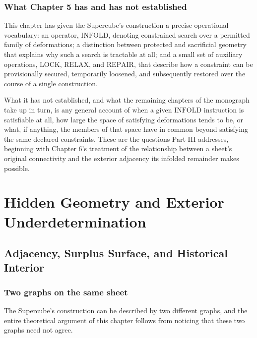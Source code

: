 \documentclass[11pt,oneside]{book}
\begin{document}
\hypertarget{what-chapter-5-has-and-has-not-established}{%
\section{What Chapter 5 has and has not
established}\label{what-chapter-5-has-and-has-not-established}}

This chapter has given the Supercube's construction a precise
operational vocabulary: an operator, \(\text{INFOLD}\), denoting
constrained search over a permitted family of deformations; a
distinction between protected and sacrificial geometry that explains why
such a search is tractable at all; and a small set of auxiliary
operations, \(\text{LOCK}\), \(\text{RELAX}\), and \(\text{REPAIR}\),
that describe how a constraint can be provisionally secured, temporarily
loosened, and subsequently restored over the course of a single
construction.

What it has not established, and what the remaining chapters of the
monograph take up in turn, is any general account of when a given
\(\text{INFOLD}\) instruction is satisfiable at all, how large the space
of satisfying deformations tends to be, or what, if anything, the
members of that space have in common beyond satisfying the same declared
constraints. These are the questions Part III addresses, beginning with
Chapter 6's treatment of the relationship between a sheet's original
connectivity and the exterior adjacency its infolded remainder makes
possible.

\part{Hidden Geometry and Exterior Underdetermination}

\hypertarget{chapter-6.-adjacency-surplus-surface-and-historical-interior}{%
\chapter{Adjacency, Surplus Surface, and Historical
Interior}\label{chapter-6.-adjacency-surplus-surface-and-historical-interior}}

\hypertarget{two-graphs-on-the-same-sheet}{%
\section{Two graphs on the same
sheet}\label{two-graphs-on-the-same-sheet}}

The Supercube's construction can be described by two different graphs,
and the entire theoretical argument of this chapter follows from
noticing that these two graphs need not agree.
\end{document}
